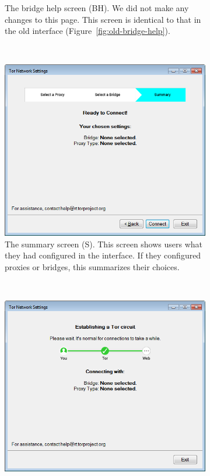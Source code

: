 \documentclass[USenglish,oneside,twocolumn]{article}
\begin{document}
\begin{figure}
\begin{subfigure}[b]{0.30\textwidth}
	\centering\captionsetup{width=1.5\linewidth}%
	\caption{The bridge help screen (BH). We did not make any changes to this page. This screen is identical to that in the old interface (Figure~\ref{fig:old-bridge-help}).}
	\label{fig:new-bridge-help}
\end{subfigure}
~~~~~~~~~~
\begin{subfigure}[b]{0.30\textwidth}
	\includegraphics[width=\textwidth]{screenshots/NEW-summary.png}
	\centering\captionsetup{width=1.5\linewidth}%
	\caption{The summary screen (S). This screen shows users what they had configured in the interface. If they  configured proxies or bridges, this summarizes their choices.}
	\label{fig:new-summary}
\end{subfigure}
~~~~~~~~~~~~~~~~~~~~~~~~~
\begin{subfigure}[b]{0.30\textwidth}
	\includegraphics[width=\textwidth]{screenshots/NEW-progress.png}

\end{subfigure}
\end{figure}
\end{document}
